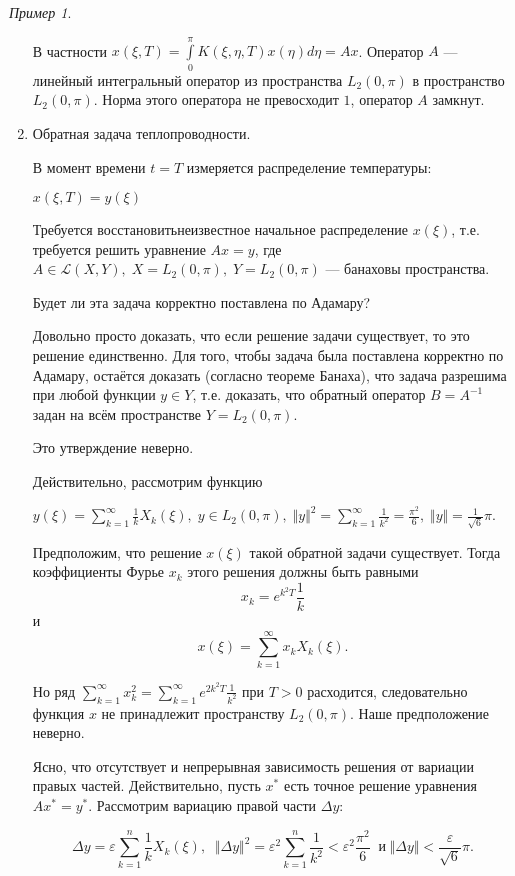\documentclass[12pt,a4paper,titlepage,oneside]{book}
\theoremstyle{definition}
\theoremstyle{plain}
\theoremstyle{break}
\theoremstyle{remark}
\theoremstyle{remark}
\newtheorem*{example}{Пример}
\theoremstyle{remark}
\theoremstyle{remark}
\theoremstyle{plain}
\theoremstyle{plain}
\begin{document}
\begin{example}
\begin{enumerate}
В частности $x(\xi,T) = \displaystyle\int\limits_0^\pi K(\xi, \eta, T) x(\eta)d\eta = Ax$. Оператор $A$ --- линейный интегральный оператор из пространства $L_2(0, \pi)$ в пространство $L_2(0, \pi)$. Норма этого оператора не превосходит $1$, оператор $A$ замкнут.

	\item Обратная задача теплопроводности.

В момент времени $t = T$ измеряется  распределение температуры:
\begin{center}
$x(\xi, T) = y(\xi)$
\end{center}

Требуется \guillemotleft восстановить\guillemotright \;неизвестное начальное распределение $x(\xi)$, т.е. требуется решить уравнение $Ax = y$, где $A \in \mathcal{L}(X,Y), \; X = L_{2}(0, \pi), \; Y = L_{2}(0, \pi)$ --- банаховы пространства.

Будет ли эта задача корректно поставлена по Адамару?

Довольно просто доказать, что если решение задачи существует, то это решение единственно. Для того, чтобы задача была поставлена корректно по Адамару, остаётся доказать (согласно теореме Банаха), что задача разрешима при любой функции $y \in Y$, т.е. доказать, что обратный оператор $B = A^{-1}$ задан на всём пространстве $Y = L_{2}(0, \pi)$.

Это утверждение неверно.

Действительно, рассмотрим функцию
\begin{center}
$y(\xi)=\displaystyle\sum\limits_{k=1}^{\infty} \frac{1}{k} X_k(\xi) ,  \; y\in L_{2}(0, \pi), \; \Vert y \Vert^2 = \sum\limits_{k=1}^{\infty} \frac{1}{k^2} = \frac{\pi^2}{6} ,  \; \Vert y \Vert  = \frac{1}{\sqrt{6}}\pi \mbox{.}$
\end{center}

Предположим, что решение $x(\xi)$ такой обратной задачи существует. Тогда коэффициенты Фурье $x_k$ этого решения должны быть равными 
$$x_k=e^{k^2 T} \frac{1}{k}$$
и
$$x(\xi) = \displaystyle\sum\limits_{k=1}^{\infty} x_k X_k(\xi).$$

Но ряд $\displaystyle\sum\limits_{k=1}^{\infty} x_k^2 = \sum\limits_{k=1}^{\infty} e^{2k^2 T} \frac{1}{k^2}$ при $T > 0$ расходится, следовательно функция $x$ не принадлежит пространству $L_2(0,\pi)$. Наше предположение неверно.

Ясно, что отсутствует и непрерывная зависимость решения от вариации правых частей. Действительно, пусть $x^{*}$ есть точное решение уравнения $Ax^*=y^*$. Рассмотрим вариацию правой части  $\Delta y$:
\begin{center}
$$\Delta y = \varepsilon \sum \limits_{k=1}^{n} \frac{1}{k} X_k(\xi) , \; \;  \Vert  \Delta y \Vert ^2 = \varepsilon ^2 \sum\limits_{k=1}^{n} \frac{1}{k^2} < \varepsilon^2 \frac{\pi ^2}{6} \; \; \mbox{и} \;  \Vert  \Delta y  \Vert < \frac{\varepsilon}{\sqrt{6}}\pi.$$
\end{center}


\end{enumerate}
\end{example}
\end{document}
